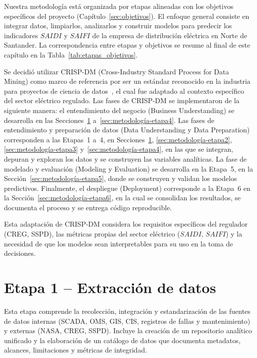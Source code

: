 
Nuestra metodología está organizada por etapas alineadas con los objetivos específicos del proyecto (Capítulo~\ref{sec:objetivos}). El enfoque general consiste en integrar datos, limpiarlos, analizarlos y construir modelos para predecir los indicadores $SAIDI$ y $SAIFI$ de la empresa de distribución eléctrica en Norte de Santander. La correspondencia entre etapas y objetivos se resume al final de este capítulo en la Tabla~\ref{tab:etapas_objetivos}.


Se decidió utilizar CRISP-DM (Cross-Industry Standard Process for Data Mining) como marco de referencia por ser un estándar reconocido en la industria para proyectos de ciencia de datos~\textcite{ref45}, el cual fue adaptado al contexto específico del sector eléctrico regulado. Las fases de CRISP-DM se implementaron de la siguiente manera: el entendimiento del negocio (Business Understanding) se desarrolla en las Secciones~\ref{sec:metodología-etapa1} a~\ref{sec:metodología-etapa4}. Las fases de entendimiento y preparación de datos (Data Understanding y Data Preparation) corresponden a las Etapas~1 a~4, en Secciones~\ref{sec:metodología-etapa1}, \ref{sec:metodología-etapa2}, \ref{sec:metodología-etapa3} y~\ref{sec:metodología-etapa4}, en las que se integran, depuran y exploran los datos y se construyen las variables analíticas. La fase de modelado y evaluación (Modeling y Evaluation) se desarrolla en la Etapa~5, en la Sección~\ref{sec:metodología-etapa5}, donde se construyen y validan los modelos predictivos. Finalmente, el despliegue (Deployment) corresponde a la Etapa~6 en la Sección~\ref{sec:metodología-etapa6}, en la cual se consolidan los resultados, se documenta el proceso y se entrega código reproducible.

Esta adaptación de CRISP-DM considera los requisitos específicos del regulador (CREG, SSPD), las métricas propias del sector eléctrico ($SAIDI$, $SAIFI$) y la necesidad de que los modelos sean interpretables para su uso en la toma de decisiones.




\section{Etapa 1 – Extracción de datos}
\label{sec:metodología-etapa1}

Esta etapa comprende la recolección, integración y estandarización de las fuentes de datos internas (SCADA, OMS, GIS, CIS, registros de fallas y mantenimiento) y externas (NASA, CREG, SSPD). Incluye la creación de un repositorio analítico unificado y la elaboración de un catálogo de datos que documenta metadatos, alcances, limitaciones y métricas de integridad.

